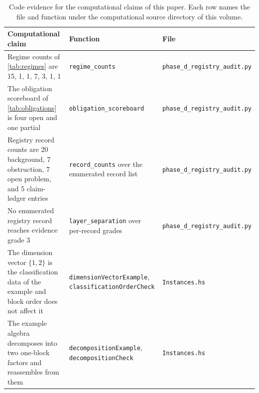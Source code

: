 \documentclass[11pt,letterpaper]{article}
\theoremstyle{definition}
\begin{document}
\begin{table}[htbp]
\caption{Code evidence for the computational claims of this paper. Each row names the file and function under the computational source directory of this volume.}
\label{tab:code}
\footnotesize
\begin{tabularx}{\textwidth}{>{\hsize=1.02\hsize\raggedright\arraybackslash}X >{\hsize=0.99\hsize\raggedright\arraybackslash}X >{\hsize=0.99\hsize\raggedright\arraybackslash}X}
\toprule
Computational claim & Function & File \\
\midrule
Regime counts of \cref{tab:regimes} are 15, 1, 1, 7, 3, 1, 1 & \texttt{regime\_counts} & \texttt{phase\_d\_registry\_audit.py} \\
The obligation scoreboard of \cref{tab:obligations} is four open and one partial & \texttt{obligation\_scoreboard} & \texttt{phase\_d\_registry\_audit.py} \\
Registry record counts are 20 background, 7 obstruction, 7 open problem, and 5 claim-ledger entries & \texttt{record\_counts} over the enumerated record list & \texttt{phase\_d\_registry\_audit.py} \\
No enumerated registry record reaches evidence grade 3 & \texttt{layer\_separation} over per-record grades & \texttt{phase\_d\_registry\_audit.py} \\
The dimension vector $\{1,2\}$ is the classification data of the example and block order does not affect it & \texttt{dimensionVectorExample}, \texttt{classificationOrderCheck} & \texttt{Instances.hs} \\
The example algebra decomposes into two one-block factors and reassembles from them & \texttt{decompositionExample}, \texttt{decompositionCheck} & \texttt{Instances.hs} \\
\bottomrule
\end{tabularx}
\end{table}
\end{document}
